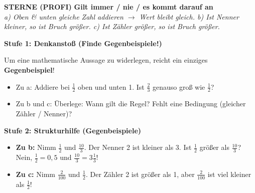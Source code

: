 \documentclass[a4paper,10pt]{article}
\newcommand{\mFrac}[2]{\frac{#1}{#2}}
\begin{document}
\begin{tcolorbox}[
    enhanced, colback=white, colframe=primaryBlue, arc=3mm, boxrule=1.2pt,
    left=4.5mm, right=4.5mm, top=2.5mm, bottom=2.5mm, height=12.9cm
]
    \begin{center}
        {\color{lvlPurple}\textbf{\faStar\faStar\faStar{} STERNE (PROFI)}}\quad
        {\color{primaryBlue}\large\bfseries {}\quad Gilt immer / nie / es kommt darauf an}\\[1mm]
        {\footnotesize\textit{a) Oben \& unten gleiche Zahl addieren $\rightarrow$ Wert bleibt gleich. \quad b) Ist Nenner kleiner, so ist Bruch größer. \quad c) Ist Zähler größer, so ist Bruch größer.}}
    \end{center}
    \vspace{0.5mm}

    \begin{tcolorbox}[colback=step1Bg, colframe=step1Border, arc=2mm, boxrule=0.7pt, left=3mm, right=3mm, top=1.8mm, bottom=1.8mm]
        {\color{step1Text}\bfseries\faLightbulb\enskip Stufe 1: Denkanstoß (Finde Gegenbeispiele!)}\\[0.8mm]
        {\small
        Um eine mathematische Aussage zu widerlegen, reicht ein einziges \textbf{Gegenbeispiel}!
        \begin{itemize}[leftmargin=4mm, itemsep=0.2pt, topsep=1pt]
            \item Zu a: Addiere bei $\mFrac{1}{2}$ oben und unten 1. Ist $\mFrac{2}{3}$ genauso groß wie $\mFrac{1}{2}$?
            \item Zu b und c: Überlege: Wann gilt die Regel? Fehlt eine Bedingung (gleicher Zähler / Nenner)?
        \end{itemize}
        }
    \end{tcolorbox}
    \vspace{0.8mm}

    \begin{tcolorbox}[colback=step2Bg, colframe=step2Border, arc=2mm, boxrule=0.7pt, left=3mm, right=3mm, top=1.8mm, bottom=1.8mm]
        {\color{step2Text}\bfseries\faSearch\enskip Stufe 2: Strukturhilfe (Gegenbeispiele)}\\[0.8mm]
        {\small
        \begin{itemize}[leftmargin=4mm, itemsep=0.2pt, topsep=1pt]
            \item \textbf{Zu b:} Nimm $\mFrac{1}{2}$ und $\mFrac{10}{3}$. Der Nenner 2 ist kleiner als 3. Ist $\mFrac{1}{2}$ größer als $\mFrac{10}{3}$? Nein, $\mFrac{1}{2} = 0,5$ und $\mFrac{10}{3} = 3\mFrac{1}{3}$!
            \item \textbf{Zu c:} Nimm $\mFrac{2}{100}$ und $\mFrac{1}{2}$. Der Zähler 2 ist größer als 1, aber $\mFrac{2}{100}$ ist viel kleiner als $\mFrac{1}{2}$!
        \end{itemize}
        }
    \end{tcolorbox}
    \vspace{0.8mm}


\end{tcolorbox}
\end{document}
